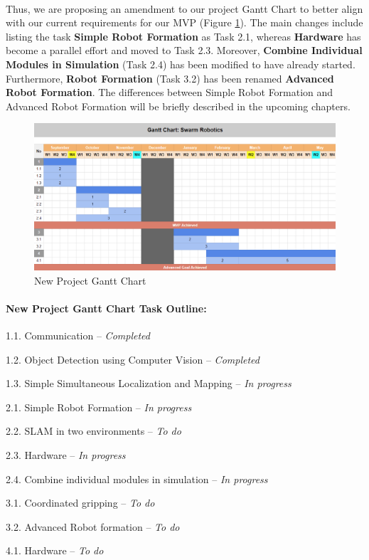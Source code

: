 \paragraph*{}
Thus, we are proposing an amendment to our project Gantt Chart to better align with our current requirements for our MVP (Figure \ref{fig:new_gantt_chart}). The main changes include listing the task \textbf{Simple Robot Formation} as Task 2.1, whereas \textbf{Hardware} has become a parallel effort and moved to Task 2.3. Moreover, \textbf{Combine Individual Modules in Simulation} (Task 2.4) has been modified to have already started. Furthermore, \textbf{Robot Formation} (Task 3.2) has been renamed \textbf{Advanced Robot Formation}. The differences between Simple Robot Formation and Advanced Robot Formation will be briefly described in the upcoming chapters.

\begin{figure}[H]
    \centering
    \includegraphics[width=1\linewidth]{assets/images/introduction/new_gantt_chart.png}
    \caption{New Project Gantt Chart}
    \label{fig:new_gantt_chart}
\end{figure}

\paragraph*{New Project Gantt Chart Task Outline:}
\begin{description}
    \item 1.1. Communication -- \textit{Completed}
    \item 1.2. Object Detection using Computer Vision -- \textit{Completed}
    \item 1.3. Simple Simultaneous Localization and Mapping -- \textit{In progress}
    \item 2.1. Simple Robot Formation -- \textit{In progress}
    \item 2.2. SLAM in two environments -- \textit{To do}
    \item 2.3. Hardware -- \textit{In progress}
    \item 2.4. Combine individual modules in simulation -- \textit{In progress}
    \item 3.1. Coordinated gripping -- \textit{To do}
    \item 3.2. Advanced Robot formation -- \textit{To do}
    \item 4.1. Hardware -- \textit{To do}
\end{description}
